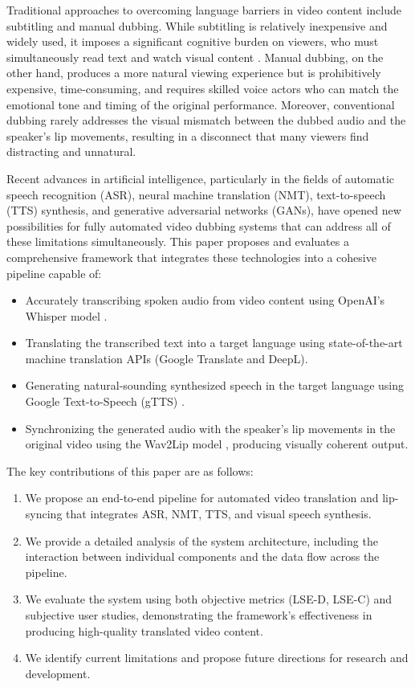 \documentclass[conference]{IEEEtran}
\begin{document}
Traditional approaches to overcoming language barriers in video content include subtitling and manual dubbing. While subtitling is relatively inexpensive and widely used, it imposes a significant cognitive burden on viewers, who must simultaneously read text and watch visual content \cite{b2}. Manual dubbing, on the other hand, produces a more natural viewing experience but is prohibitively expensive, time-consuming, and requires skilled voice actors who can match the emotional tone and timing of the original performance. Moreover, conventional dubbing rarely addresses the visual mismatch between the dubbed audio and the speaker's lip movements, resulting in a disconnect that many viewers find distracting and unnatural.

Recent advances in artificial intelligence, particularly in the fields of automatic speech recognition (ASR), neural machine translation (NMT), text-to-speech (TTS) synthesis, and generative adversarial networks (GANs), have opened new possibilities for fully automated video dubbing systems that can address all of these limitations simultaneously. This paper proposes and evaluates a comprehensive framework that integrates these technologies into a cohesive pipeline capable of:

\begin{itemize}
    \item Accurately transcribing spoken audio from video content using OpenAI's Whisper model \cite{b3}.
    \item Translating the transcribed text into a target language using state-of-the-art machine translation APIs (Google Translate and DeepL).
    \item Generating natural-sounding synthesized speech in the target language using Google Text-to-Speech (gTTS) \cite{b4}.
    \item Synchronizing the generated audio with the speaker's lip movements in the original video using the Wav2Lip model \cite{b5}, producing visually coherent output.
\end{itemize}

The key contributions of this paper are as follows:
\begin{enumerate}
    \item We propose an end-to-end pipeline for automated video translation and lip-syncing that integrates ASR, NMT, TTS, and visual speech synthesis.
    \item We provide a detailed analysis of the system architecture, including the interaction between individual components and the data flow across the pipeline.
    \item We evaluate the system using both objective metrics (LSE-D, LSE-C) and subjective user studies, demonstrating the framework's effectiveness in producing high-quality translated video content.
    \item We identify current limitations and propose future directions for research and development.
\end{enumerate}
\end{document}
